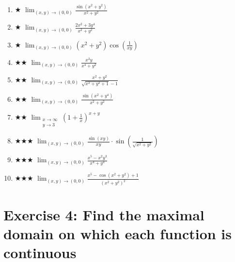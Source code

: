 \documentclass[12pt,a4paper]{article}
\newcommand{\easy}{{\color{green!60!black}$\bigstar$}}
\newcommand{\medium}{{\color{orange}$\bigstar\bigstar$}}
\newcommand{\hard}{{\color{red}$\bigstar\bigstar\bigstar$}}
\begin{document}
\begin{enumerate}[leftmargin=*, label=(\alph*)]

\item \easy\quad
$\displaystyle\lim_{(x,y)\to(0,0)} \frac{\sin(x^2+y^2)}{x^2+y^2}$

\item \easy\quad
$\displaystyle\lim_{(x,y)\to(0,0)} \frac{2x^2+3y^4}{x^2+y^2}$

\item \easy\quad
$\displaystyle\lim_{(x,y)\to(0,0)} (x^2+y^2)\cos\!\left(\frac{1}{xy}\right)$

\item \medium\quad
$\displaystyle\lim_{(x,y)\to(0,0)} \frac{x^3 y}{x^4+y^2}$

\item \medium\quad
$\displaystyle\lim_{(x,y)\to(0,0)} \frac{x^2+y^2}{\sqrt{x^2+y^2+1}-1}$

\item \medium\quad
$\displaystyle\lim_{(x,y)\to(0,0)} \frac{\sin(x^2+y^4)}{x^2+y^2}$

\item \medium\quad
$\displaystyle\lim_{\substack{x\to\infty\\y\to 3}}\left(1+\frac{1}{x}\right)^{x+y}$

\item \hard\quad
$\displaystyle\lim_{(x,y)\to(0,0)} \frac{\sin(xy)}{xy}\cdot\sin\!\left(\frac{1}{\sqrt{x^2+y^2}}\right)$

\item \hard\quad
$\displaystyle\lim_{(x,y)\to(0,0)} \frac{x^5 - x^2 y^3}{x^4+y^4}$

\item \hard\quad
$\displaystyle\lim_{(x,y)\to(0,0)} \frac{x^5 - \cos(x^2+y^2)+1}{(x^2+y^2)^2}$

\end{enumerate}

\section*{Exercise 4: Find the maximal domain on which each function is continuous}
\end{document}
